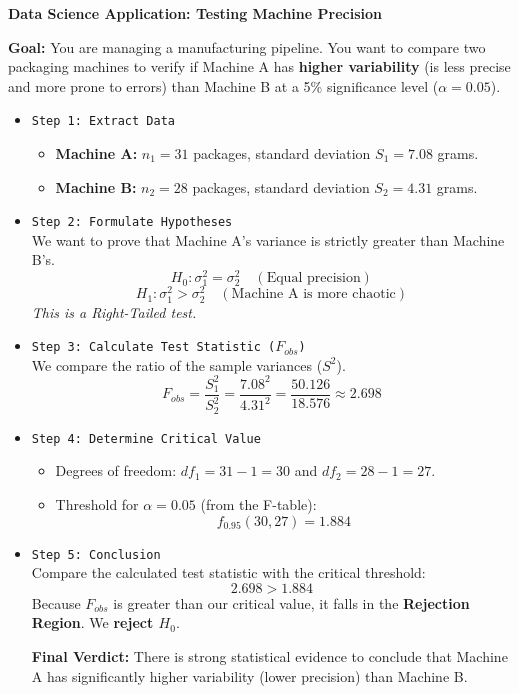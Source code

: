 \vspace{0.2cm}
\begin{example}{\textbf{Data Science Application: Testing Machine Precision}}

\textbf{Goal:} You are managing a manufacturing pipeline. You want to compare two packaging machines to verify if Machine A has \textbf{higher variability} (is less precise and more prone to errors) than Machine B at a 5\% significance level ($\alpha = 0.05$).

\begin{itemize}
    \item \texttt{Step 1: Extract Data} 
    \begin{itemize}
        \item \textbf{Machine A:} $n_1 = 31$ packages, standard deviation $S_1 = 7.08$ grams.
        \item \textbf{Machine B:} $n_2 = 28$ packages, standard deviation $S_2 = 4.31$ grams.
    \end{itemize}

    \item \texttt{Step 2: Formulate Hypotheses} \\
    We want to prove that Machine A's variance is strictly greater than Machine B's.
    $$ H_0: \sigma_1^2 = \sigma_2^2 \quad (\text{Equal precision}) $$
    $$ H_1: \sigma_1^2 > \sigma_2^2 \quad (\text{Machine A is more chaotic}) $$ 
    \textit{This is a Right-Tailed test.}

    \item \texttt{Step 3: Calculate Test Statistic ($F_{obs}$)} \\
    We compare the ratio of the sample variances ($S^2$).
    $$ F_{obs} = \frac{S_1^2}{S_2^2} = \frac{7.08^2}{4.31^2} = \frac{50.126}{18.576} \approx 2.698 $$ 

    \item \texttt{Step 4: Determine Critical Value} 
    \begin{itemize}
        \item Degrees of freedom: $df_1 = 31 - 1 = 30$ and $df_2 = 28 - 1 = 27$.
        \item Threshold for $\alpha = 0.05$ (from the F-table):
        $$ f_{0.95}(30, 27) = 1.884 $$ 
    \end{itemize}

    \item \texttt{Step 5: Conclusion} \\
    Compare the calculated test statistic with the critical threshold:
    $$ 2.698 > 1.884 $$ 
    Because $F_{obs}$ is greater than our critical value, it falls in the \textbf{Rejection Region}. We \textbf{reject $H_0$}. 
    
    \textbf{Final Verdict:} There is strong statistical evidence to conclude that Machine A has significantly higher variability (lower precision) than Machine B.
\end{itemize}
\end{example}

\pagebreak
